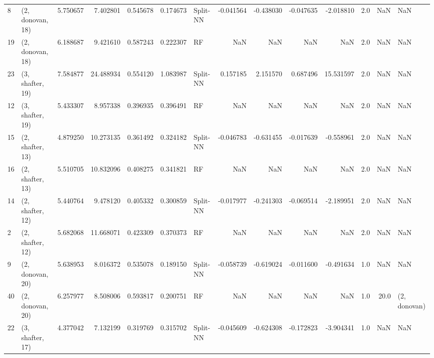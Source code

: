 \begin{tabular}{llrrrrlrrrrrrl}
8  &  (2, donovan, 18) &   5.750657 &   7.402801 &   0.545678 &  0.174673 &    Split-NN &       -0.041564 &     -0.438030 &      -0.047635 &    -2.018810 &            2.0 &    NaN &              NaN \\
19 &  (2, donovan, 18) &   6.188687 &   9.421610 &   0.587243 &  0.222307 &          RF &             NaN &           NaN &            NaN &          NaN &            2.0 &    NaN &              NaN \\
23 &  (3, shafter, 19) &   7.584877 &  24.488934 &   0.554120 &  1.083987 &    Split-NN &        0.157185 &      2.151570 &       0.687496 &    15.531597 &            2.0 &    NaN &              NaN \\
12 &  (3, shafter, 19) &   5.433307 &   8.957338 &   0.396935 &  0.396491 &          RF &             NaN &           NaN &            NaN &          NaN &            2.0 &    NaN &              NaN \\
15 &  (2, shafter, 13) &   4.879250 &  10.273135 &   0.361492 &  0.324182 &    Split-NN &       -0.046783 &     -0.631455 &      -0.017639 &    -0.558961 &            2.0 &    NaN &              NaN \\
16 &  (2, shafter, 13) &   5.510705 &  10.832096 &   0.408275 &  0.341821 &          RF &             NaN &           NaN &            NaN &          NaN &            2.0 &    NaN &              NaN \\
14 &  (2, shafter, 12) &   5.440764 &   9.478120 &   0.405332 &  0.300859 &    Split-NN &       -0.017977 &     -0.241303 &      -0.069514 &    -2.189951 &            2.0 &    NaN &              NaN \\
2  &  (2, shafter, 12) &   5.682068 &  11.668071 &   0.423309 &  0.370373 &          RF &             NaN &           NaN &            NaN &          NaN &            2.0 &    NaN &              NaN \\
9  &  (2, donovan, 20) &   5.638953 &   8.016372 &   0.535078 &  0.189150 &    Split-NN &       -0.058739 &     -0.619024 &      -0.011600 &    -0.491634 &            1.0 &    NaN &              NaN \\
40 &  (2, donovan, 20) &   6.257977 &   8.508006 &   0.593817 &  0.200751 &          RF &             NaN &           NaN &            NaN &          NaN &            1.0 &   20.0 &     (2, donovan) \\
22 &  (3, shafter, 17) &   4.377042 &   7.132199 &   0.319769 &  0.315702 &    Split-NN &       -0.045609 &     -0.624308 &      -0.172823 &    -3.904341 &            1.0 &    NaN &              NaN \\

\end{tabular}
